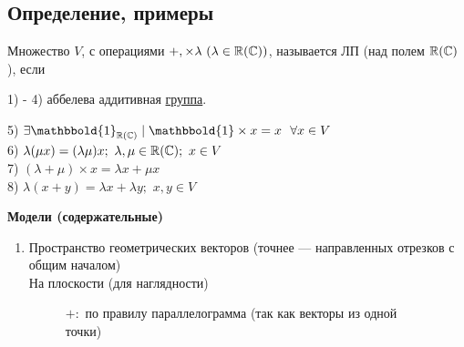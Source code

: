 \subsection{%
  Определение, примеры
}
\begin{definition}
	Множество $V$, с операциями $+, \times\lambda \,\,(\lambda \in \mathbb{R}(\mathbb{C}))$, называется ЛП (над полем $\mathbb{R}(\mathbb{C})$), если
	\begin{axi}[1]
		\hspace{0.5em}1) - 4) аббелева аддитивная \hyperref[def:group]{группа}.
	\end{axi}
	\begin{axi}[2]
		\hspace{0.5em}5) $\exists \mathbbold{1}_{\RR(\CC)} \mid \mathbbold{1} \times x = x \,\,\,\, \forall x \in V$\\[1.5mm]
		\hspace*{3.3em}6) $\lambda(\mu x) = (\lambda\mu)x; \,\, \lambda, \mu \in \mathbb{R} (\mathbb{C});\,\, x \in V$\\[1.5mm]
		\hspace*{3.3em}7) $(\lambda + \mu) \times x = \lambda x + \mu x$\\[1.5mm]
		\hspace*{3.3em}8) $\lambda(x + y) = \lambda x + \lambda y; \,\, x, y \in V$\\
	\end{axi}
\end{definition}
\textbf{Модели (содержательные)}
\begin{enumerate}
	\item Пространство геометрических векторов (точнее --- направленных отрезков с общим началом)\\
	На плоскости (для наглядности)\\
	\begin{figure}[h]
	\centering
	\begin{adjustbox}{valign=t,minipage={0.38\textwidth}}
	\centering
	\end{adjustbox}\hfill
	\begin{adjustbox}{valign=t,minipage={0.62\textwidth}}
	\parbox{\linewidth}{
		$+:$ по правилу параллелограмма (так как векторы из одной точки)\\
		
	}
	\end{adjustbox}
	\end{figure}




\end{enumerate}


